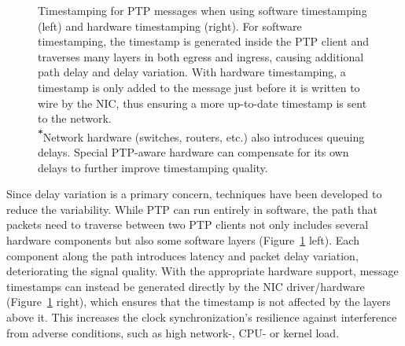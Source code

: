 \begin{figure}
    \caption{
        Timestamping for PTP messages when using software timestamping (left) and hardware timestamping (right). For software timestamping, the timestamp is generated inside the PTP client and traverses many layers in both egress and ingress, causing additional path delay and delay variation. With hardware timestamping, a timestamp is only added to the message just before it is written to wire by the NIC, thus ensuring a more up-to-date timestamp is sent to the network.\\
        \textsuperscript{\textbf{*}}Network hardware (switches, routers, etc.) also introduces queuing delays. Special PTP-aware hardware can compensate for its own delays to further improve timestamping quality.
    }
    \label{fig:ptp-sw-hw}
\end{figure}

Since delay variation is a primary concern, techniques have been developed to reduce the variability. While PTP can run entirely in software, the path that packets need to traverse between two PTP clients not only includes several hardware components but also some software layers (Figure~\ref{fig:ptp-sw-hw} left). Each component along the path introduces latency and packet delay variation, deteriorating the signal quality. With the appropriate hardware support, message timestamps can instead be generated directly by the NIC driver/hardware (Figure~\ref{fig:ptp-sw-hw} right), which ensures that the timestamp is not affected by the layers above it. This increases the clock synchronization's resilience against interference from adverse conditions, such as high network-, CPU- or kernel load.

